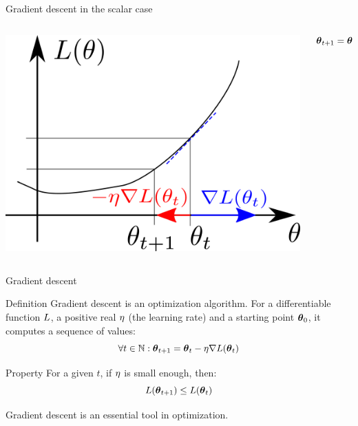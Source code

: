 \documentclass[xcolor=pdftex,dvipsnames,table,mathserif]{beamer}
\begin{document}



\begin{frame}{Gradient descent in the scalar case}

  \begin{columns}
    \begin{column}{.5\textwidth}
      \includegraphics[width=\textwidth]{gradient_descent}
    \end{column}

    \begin{column}{.5\textwidth}
      \[
      \boldsymbol{\theta}_{t+1} = \boldsymbol{\theta}_t - \eta\nabla L(\boldsymbol{\theta}_t)
      \]
    \end{column}
  \end{columns}

\end{frame}

\begin{frame}{Gradient descent}

  \begin{block}{Definition}
    Gradient descent is an optimization algorithm. For a differentiable function $L$, a positive real $\eta$ (the \alert{learning rate}) and a starting point $\boldsymbol{\theta}_0$, it computes a sequence of values:
    \[
    \forall t \in \mathbb{N}: \boldsymbol{\theta}_{t+1} = \boldsymbol{\theta}_t - \eta \nabla L(\boldsymbol{\theta}_t)
    \]
  \end{block}

  \begin{block}{Property}
    For a given $t$, if $\eta$ is small enough, then:
    \[
    L(\boldsymbol{\theta}_{t+1}) \leq L(\boldsymbol{\theta}_t)
    \]
  \end{block}

  Gradient descent is an essential tool in optimization.

\end{frame}
\end{document}
